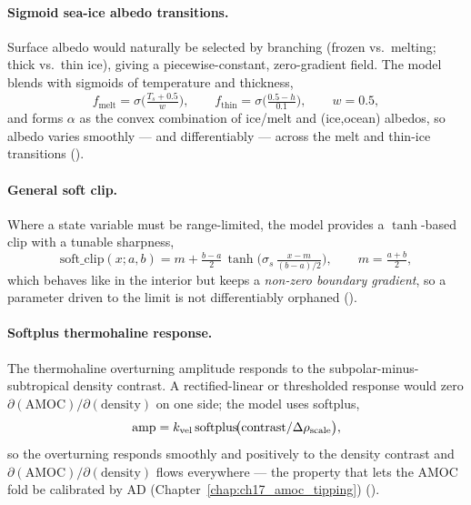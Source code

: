 \paragraph{Sigmoid sea-ice albedo transitions.} Surface albedo would naturally be selected by
branching (frozen vs.\ melting; thick vs.\ thin ice), giving a piecewise-constant, zero-gradient
field. The model blends with sigmoids of temperature and thickness,
\begin{equation}
  f_{\mathrm{melt}} = \sigma\!\Big(\tfrac{T_s+0.5}{w}\Big),
  \qquad
  f_{\mathrm{thin}} = \sigma\!\Big(\tfrac{0.5-h}{0.1}\Big),
  \qquad w=0.5,
  \label{eq:ice-albedo}
\end{equation}
and forms $\alpha$ as the convex combination of ice/melt and (ice,ocean) albedos, so albedo varies
smoothly --- and differentiably --- across the melt and thin-ice transitions
().

\paragraph{General soft clip.} Where a state variable must be range-limited, the model provides a
$\tanh$-based clip with a tunable sharpness,
\begin{equation}
  \mathrm{soft\_clip}(x;a,b)
  = m + \tfrac{b-a}{2}\,\tanh\!\Big(\sigma_{\!s}\,\tfrac{x-m}{(b-a)/2}\Big),
  \qquad m=\tfrac{a+b}{2},
  \label{eq:soft-clip}
\end{equation}
which behaves like  in the interior but keeps a \emph{non-zero boundary gradient}, so
a parameter driven to the limit is not differentiably orphaned
().

\paragraph{Softplus thermohaline response.} The thermohaline overturning amplitude responds to the
subpolar-minus-subtropical density contrast. A rectified-linear or thresholded response would zero
$\partial(\text{AMOC})/\partial(\text{density})$ on one side; the model uses softplus,
\begin{equation}
  \mathrm{amp} = k_{\mathrm{vel}}\,\mathrm{softplus}\!\big(\mathrm{contrast}/\Delta\rho_{\mathrm{scale}}\big),
  \label{eq:thc-softplus}
\end{equation}
so the overturning responds smoothly and positively to the density contrast and
$\partial(\text{AMOC})/\partial(\text{density})$ flows everywhere --- the property that lets the
AMOC fold be calibrated by AD (Chapter~\ref{chap:ch17_amoc_tipping})
().

